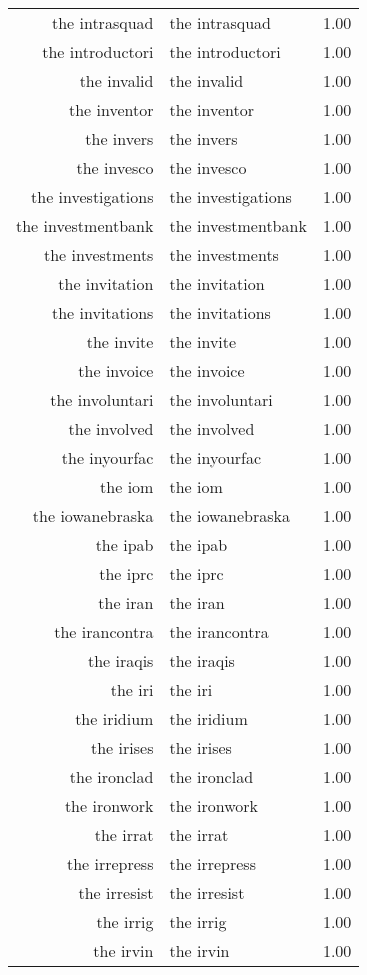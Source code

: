 \begin{table}[ht]
\begin{tabular}{rlr}
  the intrasquad & the intrasquad & 1.00 \\ 
  the introductori & the introductori & 1.00 \\ 
  the invalid & the invalid & 1.00 \\ 
  the inventor & the inventor & 1.00 \\ 
  the invers & the invers & 1.00 \\ 
  the invesco & the invesco & 1.00 \\ 
  the investigations & the investigations & 1.00 \\ 
  the investmentbank & the investmentbank & 1.00 \\ 
  the investments & the investments & 1.00 \\ 
  the invitation & the invitation & 1.00 \\ 
  the invitations & the invitations & 1.00 \\ 
  the invite & the invite & 1.00 \\ 
  the invoice & the invoice & 1.00 \\ 
  the involuntari & the involuntari & 1.00 \\ 
  the involved & the involved & 1.00 \\ 
  the inyourfac & the inyourfac & 1.00 \\ 
  the iom & the iom & 1.00 \\ 
  the iowanebraska & the iowanebraska & 1.00 \\ 
  the ipab & the ipab & 1.00 \\ 
  the iprc & the iprc & 1.00 \\ 
  the iran & the iran & 1.00 \\ 
  the irancontra & the irancontra & 1.00 \\ 
  the iraqis & the iraqis & 1.00 \\ 
  the iri & the iri & 1.00 \\ 
  the iridium & the iridium & 1.00 \\ 
  the irises & the irises & 1.00 \\ 
  the ironclad & the ironclad & 1.00 \\ 
  the ironwork & the ironwork & 1.00 \\ 
  the irrat & the irrat & 1.00 \\ 
  the irrepress & the irrepress & 1.00 \\ 
  the irresist & the irresist & 1.00 \\ 
  the irrig & the irrig & 1.00 \\ 
  the irvin & the irvin & 1.00 \\ 

\end{tabular}
\end{table}
